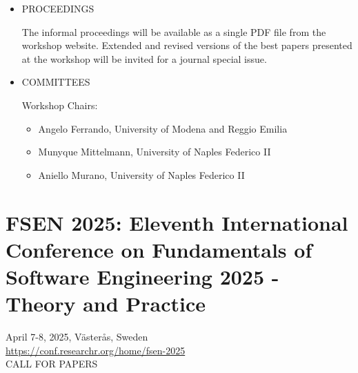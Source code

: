 \documentclass[prodmode,acmtecs]{acmsmall} %
\begin{document}
\begin{itemize}
\item  PROCEEDINGS  
 
  The informal proceedings will be available as a single PDF file from the workshop website. Extended and revised versions of the best papers presented at the workshop will be invited for a journal special issue. 
 
\item  COMMITTEES 
 
  Workshop Chairs:  
 
\begin{itemize}\item  Angelo Ferrando, University of Modena and Reggio Emilia
\item  Munyque Mittelmann, University of Naples Federico II
\item  Aniello Murano, University of Naples Federico II
\end{itemize} 
\end{itemize}\section{FSEN 2025: Eleventh International Conference on Fundamentals of Software Engineering 2025 - Theory and Practice}\label{FSEN2025}  April 7-8, 2025, Västerås, Sweden\\ 
  \href{https://conf.researchr.org/home/fsen-2025}{https://conf.researchr.org/home/fsen-2025}\\ 
CALL FOR PAPERS 
\end{document}
